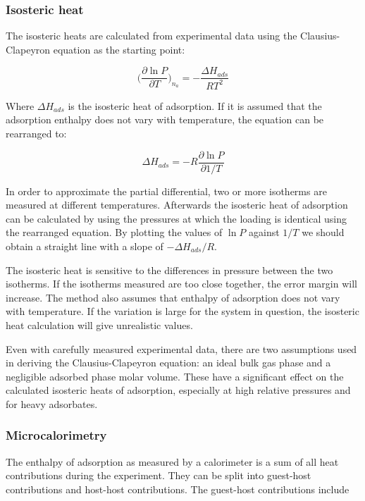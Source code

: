 \subsubsection{Isosteric heat}

The isosteric heats are calculated from experimental data using the
Clausius-Clapeyron equation as the starting point:

\begin{equation}
    \Big( \frac{\partial \ln P}{\partial T} \Big)_{n_a} = -\frac{\Delta H_{ads}}{R T^2}
\end{equation}

Where \(\Delta H_{ads}\) is the isosteric heat of adsorption.
If it is assumed that the adsorption enthalpy does not vary with 
temperature, the equation can be rearranged to:

\begin{equation}
    \Delta H_{ads} = - R \frac{\partial \ln P}{\partial 1 / T}
\end{equation}

In order to approximate the partial differential, two or more
isotherms are measured at different temperatures. 
Afterwards the isosteric heat of adsorption can be calculated
by using the pressures at which the loading is identical using the 
rearranged equation. By plotting the values of \(\ln P\) against
\(1 / T\) we should obtain a straight line with a slope
of \(- \Delta H_{ads} / R\).

The isosteric heat is sensitive to the differences in pressure between
the two isotherms. If the isotherms measured are too close together, 
the error margin will increase. The method also assumes that enthalpy 
of adsorption does not vary with temperature. If the
variation is large for the system in question, the isosteric
heat calculation will give unrealistic values.

Even with carefully measured experimental data, there are two 
assumptions used in deriving the Clausius-Clapeyron equation: 
an ideal bulk gas phase and a negligible adsorbed phase
molar volume. These have a significant effect on the calculated 
isosteric heats of adsorption, especially at high relative pressures 
and for heavy adsorbates.

\subsubsection{Microcalorimetry}


The enthalpy of adsorption as measured by a calorimeter is a 
sum of all heat contributions during the experiment. They can 
be split into guest-host contributions and host-host contributions.
The guest-host contributions include 

